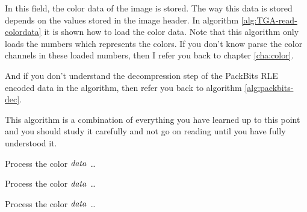 
In this field, the color data of the image is stored. The way this
data is stored depends on the values stored in the image header. In
algorithm \ref{alg:TGA-read-colordata} it is shown how to load the
color data. Note that this algorithm only loads the numbers which
represents the colors. If you don't know parse the color channels in
these loaded numbers, then I refer you back to chapter
\ref{cha:color}.

And if you don't understand the decompression step of the PackBits RLE
encoded data in the algorithm, then refer you back to algorithm
\ref{alg:packbits-dec}.

This algorithm is a combination of everything you have learned up to
this point and you should study it carefully and not go on reading until
you have fully understood it.

\begin{algorithm}[H]
  \caption{Reading and decompressing the color data of a TGA file.}
  \label{alg:TGA-read-colordata}
  \newcommand{\process}{\State Process the color $\var{data}$ \dots}
  \begin{algorithmic}[1]





        \EndIf

          \process
        \EndRepeatn

    \Else



        \EndIf

        \process


        \EndRepeatn

       \EndIf
    \Else


      \EndIf

      \process


    \EndIf
    \EndWhile
  \end{algorithmic}
\end{algorithm}

